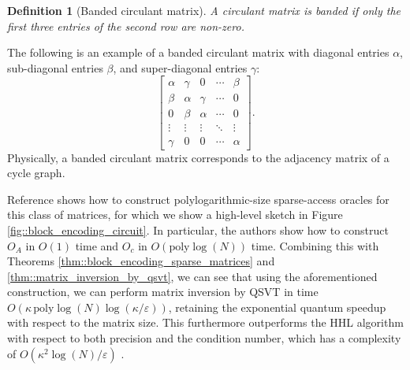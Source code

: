 \documentclass[10pt, twocolumn]{article}
\newtheorem{definition}[theorem]{Definition}
\begin{document}
\begin{definition}[Banded circulant matrix]
	A circulant matrix is banded if only the first three entries of the second row are non-zero.
\end{definition}

The following is an example of a banded circulant matrix with diagonal entries $\alpha$, sub-diagonal entries $\beta$, and super-diagonal entries $\gamma$:
\[
	\begin{bmatrix}
		\alpha & \gamma & 0 & \cdots & \beta \\
		\beta & \alpha & \gamma & \cdots & 0 \\
		0 & \beta & \alpha & \cdots & 0 \\
		\vdots & \vdots & \vdots & \ddots & \vdots \\
		\gamma & 0 & 0 & \cdots & \alpha
	\end{bmatrix}.
\]
Physically, a banded circulant matrix corresponds to the adjacency matrix of a cycle graph.

Reference \cite{camps2203explicit} shows how to construct polylogarithmic-size sparse-access oracles for this class of matrices, for which we show a high-level sketch in Figure \ref{fig::block_encoding_circuit}. In particular, the authors show how to construct $O_A$ in $O(1)$ time and $O_c$ in $O(\text{poly}\log(N))$ time. Combining this with Theorems \ref{thm::block_encoding_sparse_matrices} and \ref{thm::matrix_inversion_by_qsvt}, we can see that using the aforementioned construction, we can perform matrix inversion by QSVT in time $O(\kappa \, \text{poly}\log(N) \log(\kappa / \varepsilon))$, retaining the exponential quantum speedup with respect to the matrix size. This furthermore outperforms the HHL algorithm with respect to both precision and the condition number, which has a complexity of $O(\kappa^2 \log(N) / \varepsilon)$ \cite{harrow2009quantum}.
\end{document}
